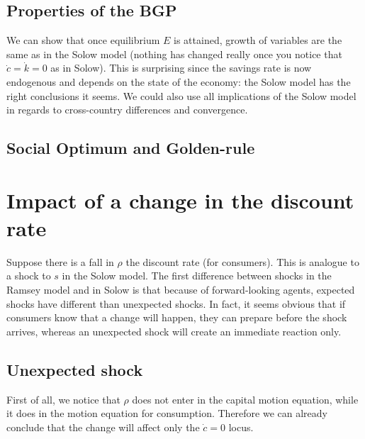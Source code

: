 \documentclass[12pt]{report}
\begin{document}
\subsection{Properties of the BGP}

We can show that once equilibrium $E$ is attained, growth of variables are the same as in the Solow model (nothing has changed really once you notice that $\dot c = \dot k = 0$ as in Solow). This is surprising since the savings rate is now endogenous and depends on the state of the economy: the Solow model has the right conclusions it seems. We could also use all implications of the Solow model in regards to cross-country differences and convergence.

\subsection{Social Optimum and Golden-rule}



\section{Impact of a change in the discount rate}

Suppose there is a fall in $\rho$ the discount rate (for consumers). This is analogue to a shock to $s$ in the Solow model. The first difference between shocks in the Ramsey model and in Solow is that because of forward-looking agents, expected shocks have different than unexpected shocks. In fact, it seems obvious that if consumers know that a change will happen, they can prepare before the shock arrives, whereas an unexpected shock will create an immediate reaction only.

\subsection{Unexpected shock}

First of all, we notice that $\rho$ does not enter in the capital motion equation, while it does in the motion equation for consumption. Therefore we can already conclude that the change will affect only the $\dot c = 0$ locus. 
\end{document}
